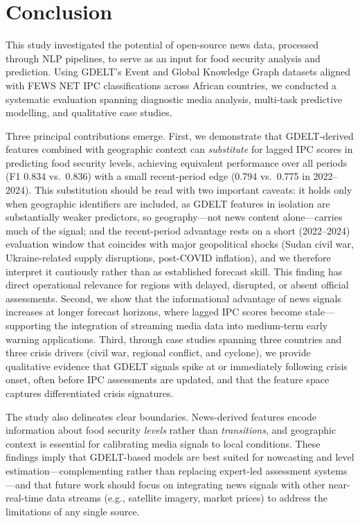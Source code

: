 \documentclass{article}
\begin{document}
\section{Conclusion}

This study investigated the potential of open-source news data, processed through NLP pipelines, to serve as an input for food security analysis and prediction. Using GDELT's Event and Global Knowledge Graph datasets aligned with FEWS NET IPC classifications across African countries, we conducted a systematic evaluation spanning diagnostic media analysis, multi-task predictive modelling, and qualitative case studies.

Three principal contributions emerge. First, we demonstrate that GDELT-derived features combined with geographic context can \textit{substitute} for lagged IPC scores in predicting food security levels, achieving equivalent performance over all periods (F1 0.834 vs.\ 0.836) with a small recent-period edge (0.794 vs.\ 0.775 in 2022--2024). This substitution should be read with two important caveats: it holds only when geographic identifiers are included, as GDELT features in isolation are substantially weaker predictors, so geography---not news content alone---carries much of the signal; and the recent-period advantage rests on a short (2022--2024) evaluation window that coincides with major geopolitical shocks (Sudan civil war, Ukraine-related supply disruptions, post-COVID inflation), and we therefore interpret it cautiously rather than as established forecast skill. This finding has direct operational relevance for regions with delayed, disrupted, or absent official assessments. Second, we show that the informational advantage of news signals increases at longer forecast horizons, where lagged IPC scores become stale---supporting the integration of streaming media data into medium-term early warning applications. Third, through case studies spanning three countries and three crisis drivers (civil war, regional conflict, and cyclone), we provide qualitative evidence that GDELT signals spike at or immediately following crisis onset, often before IPC assessments are updated, and that the feature space captures differentiated crisis signatures.

The study also delineates clear boundaries. News-derived features encode information about food security \textit{levels} rather than \textit{transitions}, and geographic context is essential for calibrating media signals to local conditions. These findings imply that GDELT-based models are best suited for nowcasting and level estimation---complementing rather than replacing expert-led assessment systems---and that future work should focus on integrating news signals with other near-real-time data streams (e.g., satellite imagery, market prices) to address the limitations of any single source.
\end{document}
